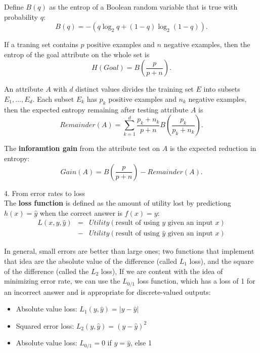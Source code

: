 \documentclass[12pt]{article}
\begin{document}
Define $B(q)$ as the entrop of a Boolean random variable that is true with probability $q$:
\begin{equation*}
  B(q) = -(q \log_2 {q} + (1-q) \log_2 (1-q)).
\end{equation*}

If a traning set contains $p$ positive examples and $n$ negative examples, then the entrop of the goal attribute on the whole set is
\begin{equation*}
  H(Goal) = B(\frac{p}{p+n}).
\end{equation*}

An attribute $A$ with $d$ distinct values divides the training set $E$ into subsets $E_1,...,E_d$. Each subset $E_k$ has $p_k$ positive examples and $n_k$ negative examples, then the expected entropy remaining after testing attribute $A$ is
\begin{equation*}
  Remainder(A) = \sum^d_{k=1} \frac{p_k+n_k}{p+n}B(\frac{p_k}{p_k+n_k}).
\end{equation*}

The {\bf inforamtion gain} from the attribute test on $A$ is the expected reduction in entropy:
\begin{equation*}
  Gain(A) = B(\frac{p}{p+n}) - Remainder(A).
\end{equation*}

4. From error rates to loss \\

The {\bf loss function} is defined as the amount of utility lost by predictiong $h(x) = \hat {y}$ when the correct answer is $f(x) = y$:
\begin{eqnarray*}
  L(x, y, \hat{y})
  &=& Utility(\text {result of using $y$ given an input $x$}) \\
  &-& Utility(\text {result of using $\hat{y}$ given an input $x$})
\end{eqnarray*}

In general, small errors are better than large ones; two functions that implement that idea are the absolute value of the difference (called $L_1$ loss), and the square of the difference (called the $L_2$ loss), If we are content with the idea of minimizing error rate, we can use the $L_{0/1}$ loss function, which has a loss of 1 for an incorrect answer and is appropriate for discrete-valued outputs:

\begin{itemize}
  \item Absolute value loss: $L_1(y, \hat{y}) = |y - \hat{y}|$
  \item Squared error loss: $L_2(y, \hat{y}) = (y - \hat{y})^2$
  \item Absolute value loss: $L_{0/1}=0$ if $y = \hat{y}$, else 1
\end{itemize}
\end{document}
